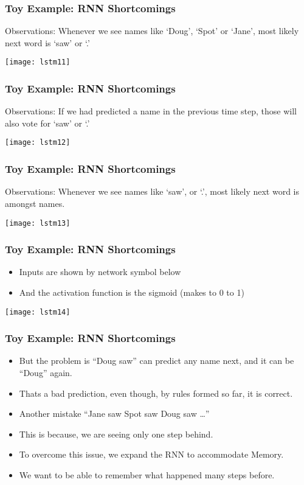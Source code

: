 \begin{frame}[fragile] \frametitle{Toy Example: RNN Shortcomings}
Observations: Whenever we see names like `Doug', `Spot' or `Jane', most likely next word is `saw' or `.'
\begin{center}
\texttt{[image: lstm11]}
\end{center}
\end{frame}

\begin{frame}[fragile] \frametitle{Toy Example: RNN Shortcomings}
Observations: If we had predicted a name in the previous time step, those will also vote for `saw' or `.'
\begin{center}
\texttt{[image: lstm12]}
\end{center}
\end{frame}

\begin{frame}[fragile] \frametitle{Toy Example: RNN Shortcomings}
Observations: Whenever we see names like `saw', or `.', most likely next word is amongst names.
\begin{center}
\texttt{[image: lstm13]}
\end{center}
\end{frame}


\begin{frame}[fragile] \frametitle{Toy Example: RNN Shortcomings}
\begin{itemize}
\item Inputs are shown by network symbol below
\item And the activation function is the sigmoid (makes to 0 to 1)
\end{itemize}
\begin{center}
\texttt{[image: lstm14]}
\end{center}
\end{frame}

\begin{frame}[fragile] \frametitle{Toy Example: RNN Shortcomings}
\begin{itemize}
\item But the problem is ``Doug saw'' can predict any name next, and it can be ``Doug'' again.
\item Thats a bad prediction, even though, by rules formed so far, it is correct.
\item Another mistake ``Jane saw Spot saw Doug saw \ldots''
\item This is because, we are seeing only one step behind.
\item To overcome this issue, we expand the RNN to accommodate Memory.
\item We want to be able to remember what happened many steps before.
\end{itemize}
\end{frame}


